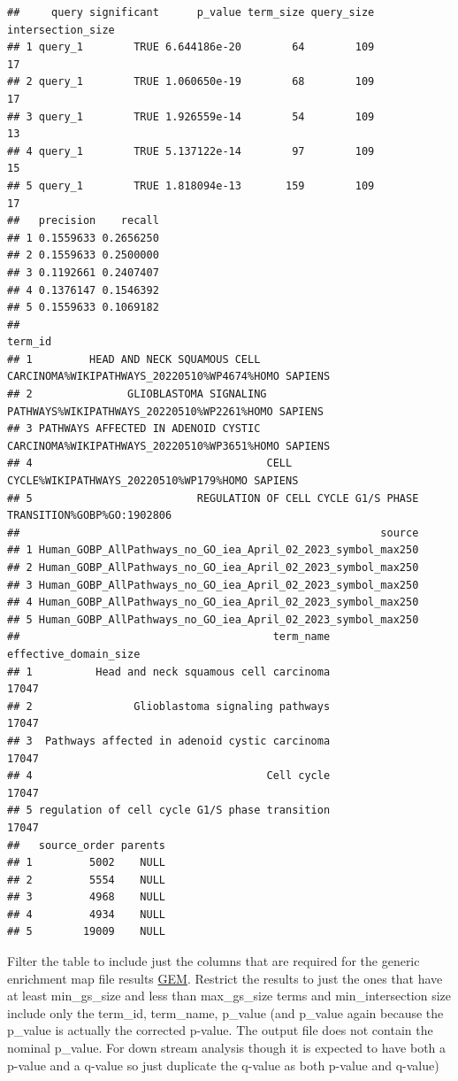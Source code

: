 \documentclass[
]{book}
\begin{document}
\begin{verbatim}
##     query significant      p_value term_size query_size intersection_size
## 1 query_1        TRUE 6.644186e-20        64        109                17
## 2 query_1        TRUE 1.060650e-19        68        109                17
## 3 query_1        TRUE 1.926559e-14        54        109                13
## 4 query_1        TRUE 5.137122e-14        97        109                15
## 5 query_1        TRUE 1.818094e-13       159        109                17
##   precision    recall
## 1 0.1559633 0.2656250
## 2 0.1559633 0.2500000
## 3 0.1192661 0.2407407
## 4 0.1376147 0.1546392
## 5 0.1559633 0.1069182
##                                                                                   term_id
## 1         HEAD AND NECK SQUAMOUS CELL CARCINOMA%WIKIPATHWAYS_20220510%WP4674%HOMO SAPIENS
## 2               GLIOBLASTOMA SIGNALING PATHWAYS%WIKIPATHWAYS_20220510%WP2261%HOMO SAPIENS
## 3 PATHWAYS AFFECTED IN ADENOID CYSTIC CARCINOMA%WIKIPATHWAYS_20220510%WP3651%HOMO SAPIENS
## 4                                     CELL CYCLE%WIKIPATHWAYS_20220510%WP179%HOMO SAPIENS
## 5                          REGULATION OF CELL CYCLE G1/S PHASE TRANSITION%GOBP%GO:1902806
##                                                         source
## 1 Human_GOBP_AllPathways_no_GO_iea_April_02_2023_symbol_max250
## 2 Human_GOBP_AllPathways_no_GO_iea_April_02_2023_symbol_max250
## 3 Human_GOBP_AllPathways_no_GO_iea_April_02_2023_symbol_max250
## 4 Human_GOBP_AllPathways_no_GO_iea_April_02_2023_symbol_max250
## 5 Human_GOBP_AllPathways_no_GO_iea_April_02_2023_symbol_max250
##                                        term_name effective_domain_size
## 1          Head and neck squamous cell carcinoma                 17047
## 2                Glioblastoma signaling pathways                 17047
## 3  Pathways affected in adenoid cystic carcinoma                 17047
## 4                                     Cell cycle                 17047
## 5 regulation of cell cycle G1/S phase transition                 17047
##   source_order parents
## 1         5002    NULL
## 2         5554    NULL
## 3         4968    NULL
## 4         4934    NULL
## 5        19009    NULL
\end{verbatim}

Filter the table to include just the columns that are required for the generic enrichment map file results \href{https://enrichmentmap.readthedocs.io/en/latest/FileFormats.html\#generic-results-files}{GEM}. Restrict the results to just the ones that have at least min\_gs\_size and less than max\_gs\_size terms and min\_intersection size include only the term\_id, term\_name, p\_value (and p\_value again because the p\_value is actually the corrected p-value. The output file does not contain the nominal p\_value. For down stream analysis though it is expected to have both a p-value and a q-value so just duplicate the q-value as both p-value and q-value)
\end{document}
